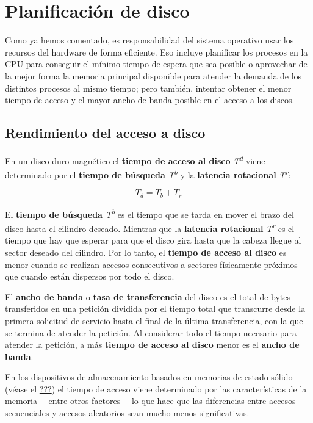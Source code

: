 \section{Planificación de disco}\label{_planificaciuxf3n_de_disco}

Como ya hemos comentado, es responsabilidad del sistema operativo usar
los recursos del hardware de forma eficiente. Eso incluye planificar los
procesos en la CPU para conseguir el mínimo tiempo de espera que sea
posible o aprovechar de la mejor forma la memoria principal disponible
para atender la demanda de los distintos procesos al mismo tiempo; pero
también, intentar obtener el menor tiempo de acceso y el mayor ancho de
banda posible en el acceso a los discos.

\subsection{Rendimiento del acceso a
disco}\label{_rendimiento_del_acceso_a_disco}

En un disco duro magnético el \textbf{tiempo de acceso al disco}{}
\emph{T\textsuperscript{d}} viene determinado por el \textbf{tiempo de
búsqueda} \emph{T\textsuperscript{b}} y la \textbf{latencia rotacional}
\emph{T\textsuperscript{r}}:

\[T_d=T_b+T_r\]

El \textbf{tiempo de búsqueda}{} \emph{T\textsuperscript{b}} es el
tiempo que se tarda en mover el brazo del disco hasta el cilindro
deseado. Mientras que la \textbf{latencia rotacional}{}
\emph{T\textsuperscript{r}} es el tiempo que hay que esperar para que el
disco gira hasta que la cabeza llegue al sector deseado del cilindro.
Por lo tanto, el \textbf{tiempo de acceso al disco} es menor cuando se
realizan accesos consecutivos a sectores físicamente próximos que cuando
están dispersos por todo el disco.

El \textbf{{}ancho de banda} o \textbf{tasa de transferencia}{} del
disco es el total de bytes transferidos en una petición dividida por el
tiempo total que transcurre desde la primera solicitud de servicio hasta
el final de la última transferencia, con la que se termina de atender la
petición. Al considerar todo el tiempo necesario para atender la
petición, a más \textbf{tiempo de acceso al disco} menor es el
\textbf{ancho de banda}.

En los dispositivos de almacenamiento basados en memorias de estado
sólido (véase el \hyperref[_memorias_de_estado_suxf3lido]{???}) el
tiempo de acceso viene determinado por las características de la memoria
---entre otros factores--- lo que hace que las diferencias entre accesos
secuenciales y accesos aleatorios sean mucho menos significativas.

